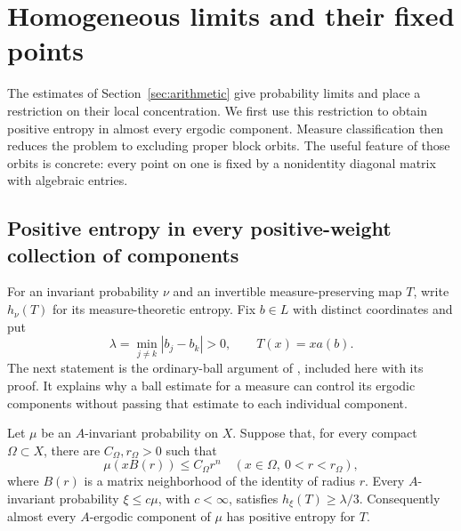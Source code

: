 \section{Homogeneous limits and their fixed points}\label{sec:homogeneous}

The estimates of Section~\ref{sec:arithmetic} give probability limits and
place a restriction on their local concentration. We first use this
restriction to obtain positive entropy in almost every ergodic component.
Measure classification then reduces the problem to excluding proper block
orbits. The useful feature of those orbits is concrete: every point on one
is fixed by a nonidentity diagonal matrix with algebraic entries.

\subsection{Positive entropy in every positive-weight collection of components}

For an invariant probability $\nu$ and an invertible measure-preserving map
$T$, write $h_\nu(T)$ for its measure-theoretic entropy. Fix
$b\in L$ with distinct coordinates and put
\[
 \lambda=\min_{j\ne k}|b_j-b_k|>0,\qquad T(x)=xa(b).
\]
The next statement is the ordinary-ball argument of
\cite[Proposition~6.1 and Lemma~6.2]{PrimeDegreePackets}, included here
with its proof. It explains why a ball estimate for a measure can control
its ergodic components without passing that estimate to each individual
component.

\begin{proposition}\label{prop:positive-entropy}
Let $\mu$ be an $A$-invariant probability on $X$. Suppose that, for every
compact $\Omega\subset X$, there are $C_\Omega,r_\Omega>0$ such that
\begin{equation}\label{eq:ordinary-ball-hypothesis}
 \mu(xB(r))\le C_\Omega r^n
 \quad(x\in\Omega,\ 0<r<r_\Omega),
\end{equation}
where $B(r)$ is a matrix neighborhood of the identity of radius $r$.
Every $A$-invariant probability $\xi\le c\mu$, with $c<\infty$, satisfies
$h_\xi(T)\ge\lambda/3$. Consequently almost every $A$-ergodic component
of $\mu$ has positive entropy for $T$.
\end{proposition}

